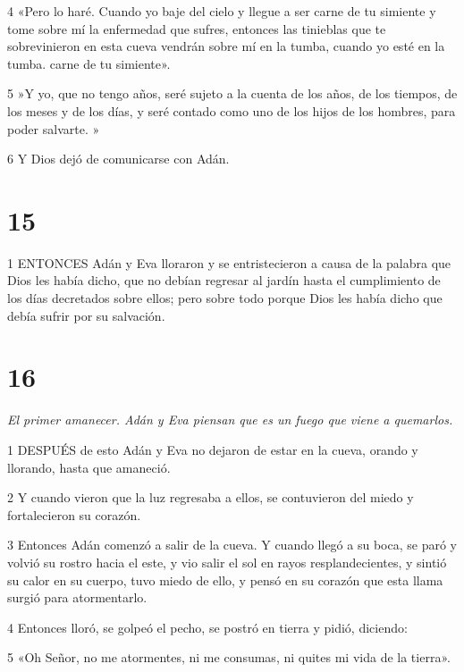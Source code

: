 \par 4 «Pero lo haré. Cuando yo baje del cielo y llegue a ser carne de tu simiente y tome sobre mí la enfermedad que sufres, entonces las tinieblas que te sobrevinieron en esta cueva vendrán sobre mí en la tumba, cuando yo esté en la tumba. carne de tu simiente».

\par 5 »Y yo, que no tengo años, seré sujeto a la cuenta de los años, de los tiempos, de los meses y de los días, y seré contado como uno de los hijos de los hombres, para poder salvarte. »

\par 6 Y Dios dejó de comunicarse con Adán.

\chapter{15}

\par 1 ENTONCES Adán y Eva lloraron y se entristecieron a causa de la palabra que Dios les había dicho, que no debían regresar al jardín hasta el cumplimiento de los días decretados sobre ellos; pero sobre todo porque Dios les había dicho que debía sufrir por su salvación.

\chapter{16}

\par \textit{El primer amanecer. Adán y Eva piensan que es un fuego que viene a quemarlos.}

\par 1 DESPUÉS de esto Adán y Eva no dejaron de estar en la cueva, orando y llorando, hasta que amaneció.

\par 2 Y cuando vieron que la luz regresaba a ellos, se contuvieron del miedo y fortalecieron su corazón.

\par 3 Entonces Adán comenzó a salir de la cueva. Y cuando llegó a su boca, se paró y volvió su rostro hacia el este, y vio salir el sol en rayos resplandecientes, y sintió su calor en su cuerpo, tuvo miedo de ello, y pensó en su corazón que esta llama surgió para atormentarlo.

\par 4 Entonces lloró, se golpeó el pecho, se postró en tierra y pidió, diciendo:

\par 5 «Oh Señor, no me atormentes, ni me consumas, ni quites mi vida de la tierra».

